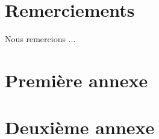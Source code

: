\documentclass[12pt,a4paper,oneside, titlepage]{report}
\begin{document}
{}
\chapter*{Remerciements}
\renewcommand{\leftmark}{REMERCIEMENTS}

Nous remercions ...\\

\newpage
\renewcommand{\leftmark}{TABLE DES MATI\`{E}RES}
\thispagestyle{fancy}
\tableofcontents
{}

















\newpage
\appendix
{}

\chapter{Premi\`ere annexe}
\renewcommand{\leftmark}{ANNEXE \thechapter.~~Premi\`ere annexe}
\label{annexe1}

\chapter{Deuxi\`eme annexe}
\renewcommand{\leftmark}{ANNEXE \thechapter.~~Deuxi\`eme annexe}
\label{annexe2}

\end{document}
